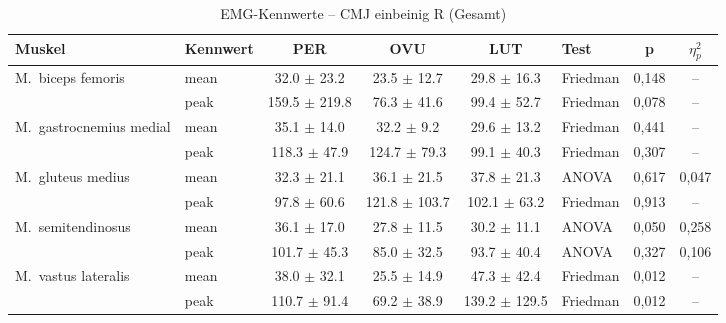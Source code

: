 \begin{table}[H]
  \centering
  \caption{EMG-Kennwerte – CMJ einbeinig R (Gesamt)}
  \label{tab:CMJ_einbeinig_R_Gesamt}
  \small
  \begin{tabular}{l l c c c l c c}
    \hline
    \textbf{Muskel} & \textbf{Kennwert} & \textbf{PER} & \textbf{OVU} & \textbf{LUT} & \textbf{Test} & \textbf{p} & \textbf{$\eta^2_p$} \\
    \hline
    M.~biceps femoris & mean & 32.0 $\pm$ 23.2 & 23.5 $\pm$ 12.7 & 29.8 $\pm$ 16.3 & Friedman & 0{,}148 & -- \\
     & peak & 159.5 $\pm$ 219.8 & 76.3 $\pm$ 41.6 & 99.4 $\pm$ 52.7 & Friedman & 0{,}078 & -- \\
    \hline
    M.~gastrocnemius medial & mean & 35.1 $\pm$ 14.0 & 32.2 $\pm$ 9.2 & 29.6 $\pm$ 13.2 & Friedman & 0{,}441 & -- \\
     & peak & 118.3 $\pm$ 47.9 & 124.7 $\pm$ 79.3 & 99.1 $\pm$ 40.3 & Friedman & 0{,}307 & -- \\
    \hline
    M.~gluteus medius & mean & 32.3 $\pm$ 21.1 & 36.1 $\pm$ 21.5 & 37.8 $\pm$ 21.3 & ANOVA & 0{,}617 & 0{,}047 \\
     & peak & 97.8 $\pm$ 60.6 & 121.8 $\pm$ 103.7 & 102.1 $\pm$ 63.2 & Friedman & 0{,}913 & -- \\
    \hline
    M.~semitendinosus & mean & 36.1 $\pm$ 17.0 & 27.8 $\pm$ 11.5 & 30.2 $\pm$ 11.1 & ANOVA & 0{,}050 & 0{,}258 \\
     & peak & 101.7 $\pm$ 45.3 & 85.0 $\pm$ 32.5 & 93.7 $\pm$ 40.4 & ANOVA & 0{,}327 & 0{,}106 \\
    \hline
    M.~vastus lateralis & mean & 38.0 $\pm$ 32.1 & 25.5 $\pm$ 14.9 & 47.3 $\pm$ 42.4 & Friedman & 0{,}012 & -- \\
     & peak & 110.7 $\pm$ 91.4 & 69.2 $\pm$ 38.9 & 139.2 $\pm$ 129.5 & Friedman & 0{,}012 & -- \\
    \hline
  \end{tabular}
\end{table}

